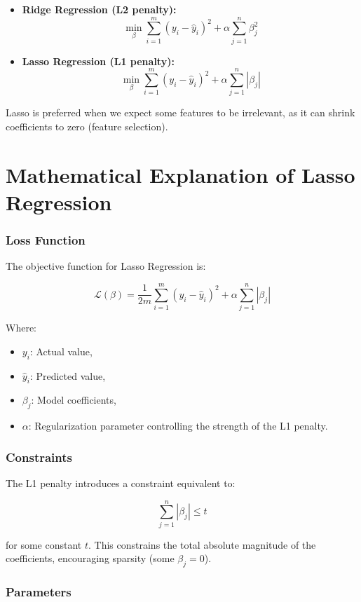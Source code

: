 \documentclass[12pt, a4paper]{report}
\begin{document}
\begin{itemize}
    \item \textbf{Ridge Regression (L2 penalty):}
    \[
    \min_{\beta} \sum_{i=1}^{m} (y_i - \hat{y}_i)^2 + \alpha \sum_{j=1}^{n} \beta_j^2
    \]
    \item \textbf{Lasso Regression (L1 penalty):}
    \[
    \min_{\beta} \sum_{i=1}^{m} (y_i - \hat{y}_i)^2 + \alpha \sum_{j=1}^{n} |\beta_j|
    \]
\end{itemize}

Lasso is preferred when we expect some features to be irrelevant, as it can shrink coefficients to zero (feature selection).

\section{ Mathematical Explanation of Lasso Regression}

\subsubsection*{Loss Function}

The objective function for Lasso Regression is:

\[
\mathcal{L}(\beta) = \frac{1}{2m} \sum_{i=1}^{m} (y_i - \hat{y}_i)^2 + \alpha \sum_{j=1}^{n} |\beta_j|
\]

Where:
\begin{itemize}
    \item \( y_i \): Actual value,
    \item \( \hat{y}_i \): Predicted value,
    \item \( \beta_j \): Model coefficients,
    \item \( \alpha \): Regularization parameter controlling the strength of the L1 penalty.
\end{itemize}

\subsubsection*{Constraints}

The L1 penalty introduces a constraint equivalent to:

\[
\sum_{j=1}^{n} |\beta_j| \leq t
\]

for some constant \( t \). This constrains the total absolute magnitude of the coefficients, encouraging sparsity (some \( \beta_j = 0 \)).

\subsubsection*{Parameters}
\end{document}
